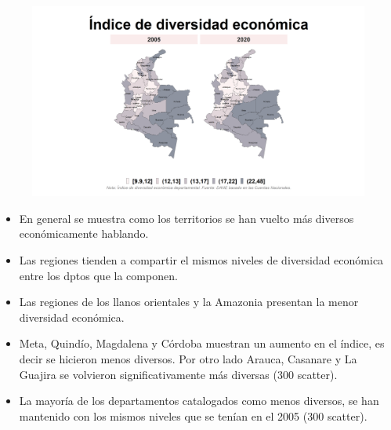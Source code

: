     \begin{figure}[H]
        \caption[Índice de diversidad económica por departamentos (mapa) - 2010 VS 2020 ]{\label{diversidad_econ_dptos_mapa} }
        \begin{center}
        \includegraphics[width=\textwidth,keepaspectratio]{img/var_300_map.png}
        \end{center}
    \end{figure}
            \begin{itemize}
                    \item En general se muestra como los territorios se han vuelto más diversos económicamente hablando.
                    \item Las regiones tienden a compartir el mismos niveles de diversidad económica entre los dptos que la componen.
                    \item Las regiones de los llanos orientales y la Amazonia presentan la menor diversidad económica.
                    \item Meta, Quindío, Magdalena y Córdoba muestran un aumento en el índice, es decir se hicieron menos diversos. Por otro lado Arauca, Casanare y La Guajira se volvieron significativamente más diversas (300 scatter).
                    \item La mayoría de los departamentos catalogados como menos diversos, se han mantenido con los mismos niveles que se tenían en el 2005 (300 scatter).
                    \end{itemize}

